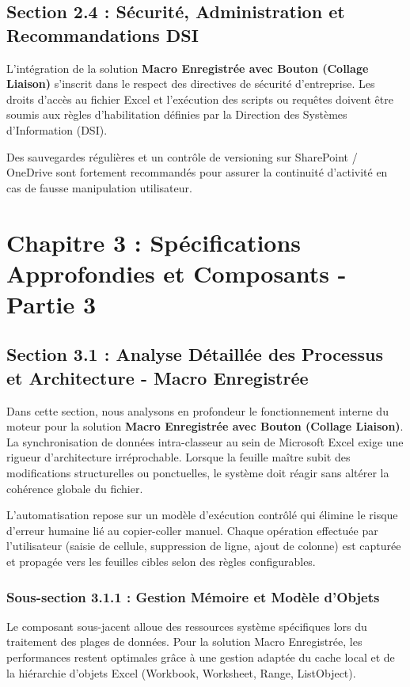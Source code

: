 \documentclass[12pt,a4paper]{report}
\begin{document}
\section{Section 2.4 : Sécurité, Administration et Recommandations DSI}
L'intégration de la solution \textbf{Macro Enregistrée avec Bouton (Collage Liaison)} s'inscrit dans le respect des directives de sécurité d'entreprise. Les droits d'accès au fichier Excel et l'exécution des scripts ou requêtes doivent être soumis aux règles d'habilitation définies par la Direction des Systèmes d'Information (DSI).

Des sauvegardes régulières et un contrôle de versioning sur SharePoint / OneDrive sont fortement recommandés pour assurer la continuité d'activité en cas de fausse manipulation utilisateur.


\chapter{Chapitre 3 : Spécifications Approfondies et Composants - Partie 3}

\section{Section 3.1 : Analyse Détaillée des Processus et Architecture - Macro Enregistrée}
Dans cette section, nous analysons en profondeur le fonctionnement interne du moteur pour la solution \textbf{Macro Enregistrée avec Bouton (Collage Liaison)}. La synchronisation de données intra-classeur au sein de Microsoft Excel exige une rigueur d'architecture irréprochable. Lorsque la feuille maître subit des modifications structurelles ou ponctuelles, le système doit réagir sans altérer la cohérence globale du fichier.

L'automatisation repose sur un modèle d'exécution contrôlé qui élimine le risque d'erreur humaine lié au copier-coller manuel. Chaque opération effectuée par l'utilisateur (saisie de cellule, suppression de ligne, ajout de colonne) est capturée et propagée vers les feuilles cibles selon des règles configurables.


\subsection{Sous-section 3.1.1 : Gestion Mémoire et Modèle d'Objets}
Le composant sous-jacent alloue des ressources système spécifiques lors du traitement des plages de données. Pour la solution Macro Enregistrée, les performances restent optimales grâce à une gestion adaptée du cache local et de la hiérarchie d'objets Excel (Workbook, Worksheet, Range, ListObject).
\end{document}
